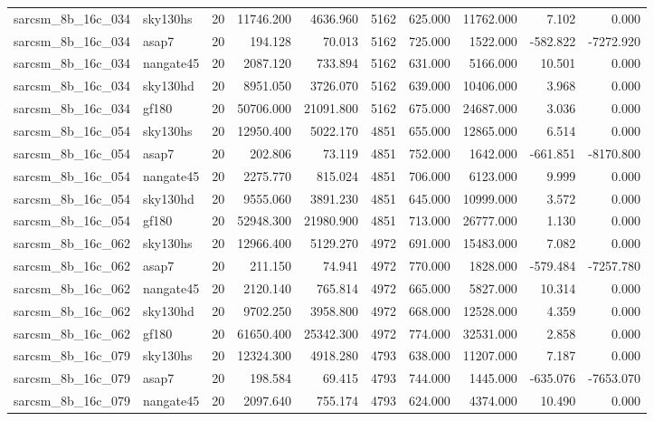 \begin{tabular}{llrrrrrrrr}
sarcsm\_8b\_16c\_034 & sky130hs & 20 & 11746.200 & 4636.960 & 5162 & 625.000 & 11762.000 & 7.102 & 0.000 \\
sarcsm\_8b\_16c\_034 & asap7 & 20 & 194.128 & 70.013 & 5162 & 725.000 & 1522.000 & -582.822 & -7272.920 \\
sarcsm\_8b\_16c\_034 & nangate45 & 20 & 2087.120 & 733.894 & 5162 & 631.000 & 5166.000 & 10.501 & 0.000 \\
sarcsm\_8b\_16c\_034 & sky130hd & 20 & 8951.050 & 3726.070 & 5162 & 639.000 & 10406.000 & 3.968 & 0.000 \\
sarcsm\_8b\_16c\_034 & gf180 & 20 & 50706.000 & 21091.800 & 5162 & 675.000 & 24687.000 & 3.036 & 0.000 \\
sarcsm\_8b\_16c\_054 & sky130hs & 20 & 12950.400 & 5022.170 & 4851 & 655.000 & 12865.000 & 6.514 & 0.000 \\
sarcsm\_8b\_16c\_054 & asap7 & 20 & 202.806 & 73.119 & 4851 & 752.000 & 1642.000 & -661.851 & -8170.800 \\
sarcsm\_8b\_16c\_054 & nangate45 & 20 & 2275.770 & 815.024 & 4851 & 706.000 & 6123.000 & 9.999 & 0.000 \\
sarcsm\_8b\_16c\_054 & sky130hd & 20 & 9555.060 & 3891.230 & 4851 & 645.000 & 10999.000 & 3.572 & 0.000 \\
sarcsm\_8b\_16c\_054 & gf180 & 20 & 52948.300 & 21980.900 & 4851 & 713.000 & 26777.000 & 1.130 & 0.000 \\
sarcsm\_8b\_16c\_062 & sky130hs & 20 & 12966.400 & 5129.270 & 4972 & 691.000 & 15483.000 & 7.082 & 0.000 \\
sarcsm\_8b\_16c\_062 & asap7 & 20 & 211.150 & 74.941 & 4972 & 770.000 & 1828.000 & -579.484 & -7257.780 \\
sarcsm\_8b\_16c\_062 & nangate45 & 20 & 2120.140 & 765.814 & 4972 & 665.000 & 5827.000 & 10.314 & 0.000 \\
sarcsm\_8b\_16c\_062 & sky130hd & 20 & 9702.250 & 3958.800 & 4972 & 668.000 & 12528.000 & 4.359 & 0.000 \\
sarcsm\_8b\_16c\_062 & gf180 & 20 & 61650.400 & 25342.300 & 4972 & 774.000 & 32531.000 & 2.858 & 0.000 \\
sarcsm\_8b\_16c\_079 & sky130hs & 20 & 12324.300 & 4918.280 & 4793 & 638.000 & 11207.000 & 7.187 & 0.000 \\
sarcsm\_8b\_16c\_079 & asap7 & 20 & 198.584 & 69.415 & 4793 & 744.000 & 1445.000 & -635.076 & -7653.070 \\
sarcsm\_8b\_16c\_079 & nangate45 & 20 & 2097.640 & 755.174 & 4793 & 624.000 & 4374.000 & 10.490 & 0.000 \\

\end{tabular}
